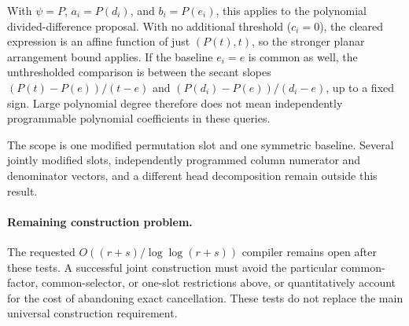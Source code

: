 \documentclass[11pt]{article}
\begin{document}
With $\psi=P$, $a_i=P(d_i)$, and $b_i=P(e_i)$, this applies to the
polynomial divided-difference proposal. With no additional threshold
($c_i=0$), the cleared expression is an affine function of just
$(P(t),t)$, so the stronger planar arrangement bound applies. If the
baseline $e_i=e$ is common as well, the unthresholded comparison is
between the secant slopes
$(P(t)-P(e))/(t-e)$ and $(P(d_i)-P(e))/(d_i-e)$, up to a fixed sign.
Large polynomial degree therefore does not mean independently
programmable polynomial coefficients in these queries.

The scope is one modified permutation slot and one symmetric baseline.
Several jointly modified slots, independently programmed column
numerator and denominator vectors, and a different head decomposition
remain outside this result.

\paragraph{Remaining construction problem.}
The requested $O((r+s)/\log\log(r+s))$ compiler remains open after these
tests. A successful joint construction must avoid the particular
common-factor, common-selector, or one-slot restrictions above, or quantitatively
account for the cost of abandoning exact cancellation. These tests do
not replace the main universal construction requirement.
\end{document}
